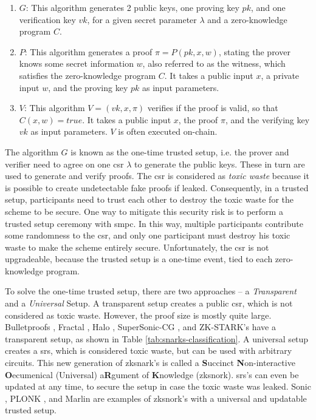 \begin{enumerate}
    \item $G$: This algorithm generates 2 public keys, one proving key $pk$, and one verification key $vk$, for a given secret parameter $\lambda$ and a zero-knowledge program $C$.
    \item $P$: This algorithm generates a proof $\pi = P(pk, x, w)$, stating the prover knows some secret information $w$, also referred to as the witness, which satisfies the zero-knowledge program $C$. It takes a public input $x$, a private input $w$, and the proving key $pk$ as input parameters.
    \item $V$: This algorithm $V = (vk, x, \pi)$ verifies if the proof is valid, so that $C(x, w) = true$. It takes a public input $x$, the proof $\pi$, and the verifying key $vk$ as input parameters. $V$ is often executed on-chain.
\end{enumerate}

The algorithm $G$ is known as the one-time trusted setup, i.e. the prover and verifier need to agree on one \acrfull{csr} $\lambda$ to generate the public keys. These in turn are used to generate and verify proofs. The \acrshort{csr} is considered as \emph{toxic waste} because it is possible to create undetectable fake proofs if leaked. Consequently, in a trusted setup, participants need to trust each other to destroy the toxic waste for the scheme to be secure. One way to mitigate this security risk is to perform a trusted setup ceremony with \acrfull{smpc}. In this way, multiple participants contribute some randomness to the \acrshort{csr}, and only one participant must destroy his toxic waste to make the scheme entirely secure. Unfortunately, the \acrshort{csr} is not upgradeable, because the trusted setup is a one-time event, tied to each zero-knowledge program.

To solve the one-time trusted setup, there are two approaches -- a \emph{Transparent} and a \emph{Universal} Setup. A transparent setup creates a public \acrshort{csr}, which is not considered as toxic waste. However, the proof size is mostly quite large. Bulletproofs \cite{bunzBulletproofsShortProofs2018}, Fractal \cite{chiesaFractalPostquantumTransparent2020}, Halo \cite{boweRecursiveProofComposition}, SuperSonic-CG \cite{bunzTransparentSNARKsDARK2020}, and ZK-STARK's \cite{ben-sassonScalableTransparentPostquantum} have a transparent setup, as shown in Table \ref{tab:snarks-classification}. A universal setup creates a \acrfull{srs}, which is considered toxic waste, but can be used with arbitrary circuits. This new generation of \acrshort{zksnark}'s is called a \textbf{S}uccinct \textbf{N}on-interactive \textbf{O}ecumenical (Universal) a\textbf{R}gument of \textbf{K}nowledge (\acrshort{zksnork}). \acrshort{srs}'s can even be updated at any time, to secure the setup in case the toxic waste was leaked. Sonic \cite{mallerSonicZeroKnowledgeSNARKs2019}, PLONK \cite{gabizonPlonKPermutationsLagrangebases}, and Marlin \cite{chiesaMarlinPreprocessingZkSNARKs2020} are examples of \acrshort{zksnork}'s with a universal and updatable trusted setup.

